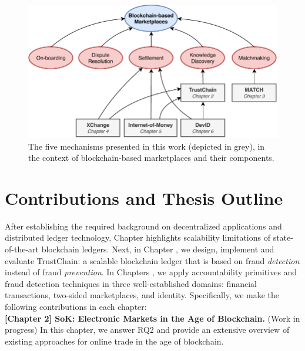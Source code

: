 
\begin{figure}[t]
	\centering
	\includegraphics[width=\linewidth]{introduction/assets/thesis_overview}
	\caption{The five mechanisms presented in this work (depicted in grey), in the context of blockchain-based marketplaces and their components.}
	\label{fig:thesis_overview}
\end{figure}

\section{Contributions and Thesis Outline}
After establishing the required background on decentralized applications and distributed ledger technology, Chapter  highlights scalability limitations of state-of-the-art blockchain ledgers.
Next, in Chapter , we design, implement and evaluate TrustChain: a scalable blockchain ledger that is based on fraud \emph{detection} instead of fraud \emph{prevention}.
In Chapters , we apply accountability primitives and fraud detection techniques in three well-established domains: financial transactions, two-sided marketplaces, and identity.
Specifically, we make the following contributions in each chapter:\\

\textbf{[Chapter 2] SoK: Electronic Markets in the Age of Blockchain.} (Work in progress)
In this chapter, we answer RQ2 and provide an extensive overview of existing approaches for online trade in the age of blockchain.\\

\\

